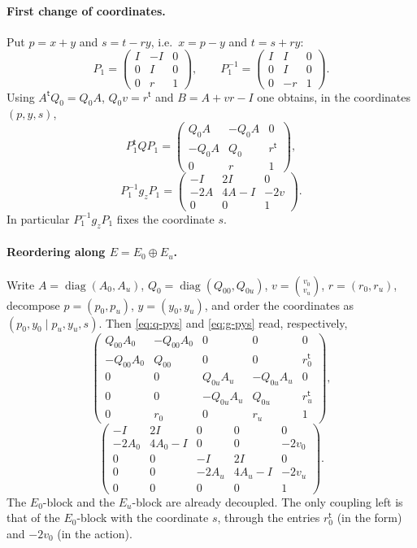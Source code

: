 \documentclass[11pt,oneside,notitlepage]{book}
\numberwithin{equation}{section}
\theoremstyle{plain}
\theoremstyle{definition}
\newcommand{\diag}{\operatorname{diag}}
\begin{document}
\paragraph{First change of coordinates.} Put $p=x+y$ and $s=t-ry$, i.e.\ $x=p-y$ and $t=s+ry$:
\[
P_1=\begin{pmatrix}I&-I&0\\0&I&0\\0&r&1\end{pmatrix},\qquad P_1^{-1}=\begin{pmatrix}I&I&0\\0&I&0\\0&-r&1\end{pmatrix}.
\]
Using $A^{\mathsf t}Q_0=Q_0A$, $Q_0v=r^{\mathsf t}$ and $B=A+vr-I$ one obtains, in the coordinates $(p,y,s)$,
\begin{equation}\label{eq:q-pys}
P_1^{\mathsf t}QP_1=\begin{pmatrix}Q_0A&-Q_0A&0\\-Q_0A&Q_0&r^{\mathsf t}\\0&r&1\end{pmatrix},
\end{equation}
\begin{equation}\label{eq:g-pys}
P_1^{-1}g_zP_1=\begin{pmatrix}-I&2I&0\\-2A&4A-I&-2v\\0&0&1\end{pmatrix}.
\end{equation}
In particular $P_1^{-1}g_zP_1$ fixes the coordinate $s$.

\paragraph{Reordering along $E=E_0\oplus E_u$.} Write $A=\diag(A_0,A_u)$, $Q_0=\diag(Q_{00},Q_{0u})$, $v=\binom{v_0}{v_u}$, $r=(r_0,r_u)$, decompose $p=(p_0,p_u)$, $y=(y_0,y_u)$, and order the coordinates as $(p_0,y_0\mid p_u,y_u,s)$. Then \eqref{eq:q-pys} and \eqref{eq:g-pys} read, respectively,
\[
\left(\begin{array}{cc|ccc}
Q_{00}A_0&-Q_{00}A_0&0&0&0\\
-Q_{00}A_0&Q_{00}&0&0&r_0^{\mathsf t}\\\hline
0&0&Q_{0u}A_u&-Q_{0u}A_u&0\\
0&0&-Q_{0u}A_u&Q_{0u}&r_u^{\mathsf t}\\
0&r_0&0&r_u&1
\end{array}\right),\]
\[
\left(\begin{array}{cc|ccc}
-I&2I&0&0&0\\
-2A_0&4A_0-I&0&0&-2v_0\\\hline
0&0&-I&2I&0\\
0&0&-2A_u&4A_u-I&-2v_u\\
0&0&0&0&1
\end{array}\right).
\]
The $E_0$-block and the $E_u$-block are already decoupled. The only coupling left is that of the $E_0$-block with the coordinate $s$, through the entries $r_0^{\mathsf t}$ (in the form) and $-2v_0$ (in the action).
\end{document}
